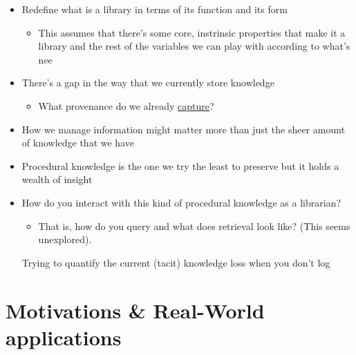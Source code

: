 \documentclass[
]{article}
\providecommand{\tightlist}{%
  \setlength{\itemsep}{0pt}\setlength{\parskip}{0pt}}\usepackage{longtable,booktabs,array}
\begin{document}
\begin{itemize}
\item
  Redefine what is a library in terms of its function and its form

  \begin{itemize}
  \tightlist
  \item
    This assumes that there's some core, instrinsic properties that make
    it a library and the rest of the variables we can play with
    according to what's nee
  \end{itemize}
\item
  There's a gap in the way that we currently store knowledge

  \begin{itemize}
  \tightlist
  \item
    What provenance do we already
    \href{https://ieeexplore.ieee.org/stamp/stamp.jsp?tp=&arnumber=7192714}{capture}?
  \end{itemize}
\item
  How we manage information might matter more than just the sheer amount
  of knowledge that we have
\item
  Procedural knowledge is the one we try the least to preserve but it
  holds a wealth of insight
\item
  How do you interact with this kind of procedural knowledge as a
  librarian?

  \begin{itemize}
  \tightlist
  \item
    That is, how do you query and what does retrieval look like? (This
    seems unexplored).
  \end{itemize}

  {Trying to quantify the current (tacit) knowledge loss when you don't
  log}
\end{itemize}

\section{Motivations \& Real-World
applications}\label{motivations-real-world-applications}
\end{document}
